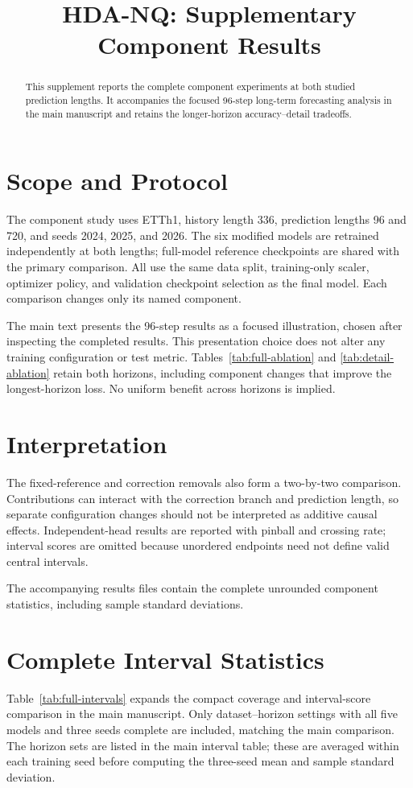 \documentclass[manuscript,anonymous,review]{acmart}
\begin{document}
\title{HDA-NQ: Supplementary Component Results}
\begin{abstract}
This supplement reports the complete component experiments at both studied prediction lengths. It accompanies the focused 96-step long-term forecasting analysis in the main manuscript and retains the longer-horizon accuracy--detail tradeoffs.
\end{abstract}
\maketitle
\section{Scope and Protocol}
The component study uses ETTh1, history length 336, prediction lengths 96 and 720, and seeds 2024, 2025, and 2026. The six modified models are retrained independently at both lengths; full-model reference checkpoints are shared with the primary comparison. All use the same data split, training-only scaler, optimizer policy, and validation checkpoint selection as the final model. Each comparison changes only its named component.

The main text presents the 96-step results as a focused illustration, chosen after inspecting the completed results. This presentation choice does not alter any training configuration or test metric. Tables~\ref{tab:full-ablation} and \ref{tab:detail-ablation} retain both horizons, including component changes that improve the longest-horizon loss. No uniform benefit across horizons is implied.



\section{Interpretation}

The fixed-reference and correction removals also form a two-by-two comparison. Contributions can interact with the correction branch and prediction length, so separate configuration changes should not be interpreted as additive causal effects. Independent-head results are reported with pinball and crossing rate; interval scores are omitted because unordered endpoints need not define valid central intervals.

The accompanying results files contain the complete unrounded component statistics, including sample standard deviations.
\section{Complete Interval Statistics}
Table~\ref{tab:full-intervals} expands the compact coverage and interval-score comparison in the main manuscript. Only dataset--horizon settings with all five models and three seeds complete are included, matching the main comparison. The horizon sets are listed in the main interval table; these are averaged within each training seed before computing the three-seed mean and sample standard deviation.

\end{document}
